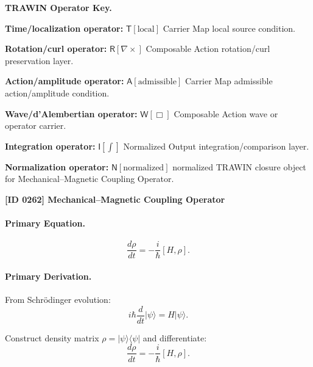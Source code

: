 \par\vspace{0.45\baselineskip}
\noindent\begin{minipage}[t]{\linewidth}
\begingroup
\small
\raggedright
\textbf{TRAWIN Operator Key.}\par
\noindent\textbf{Time/localization operator:} $\mathsf{T}\!\left[\mathrm{local}\right]$ Carrier Map local source condition.\par
\noindent\textbf{Rotation/curl operator:} $\mathsf{R}\!\left[\nabla\times\right]$ Composable Action rotation/curl preservation layer.\par
\noindent\textbf{Action/amplitude operator:} $\mathsf{A}\!\left[\mathrm{admissible}\right]$ Carrier Map admissible action/amplitude condition.\par
\noindent\textbf{Wave/d'Alembertian operator:} $\mathsf{W}\!\left[\Box\right]$ Composable Action wave or operator carrier.\par
\noindent\textbf{Integration operator:} $\mathsf{I}\!\left[\int\right]$ Normalized Output integration/comparison layer.\par
\noindent\textbf{Normalization operator:} $\mathsf{N}\!\left[\mathrm{normalized}\right]$ normalized TRAWIN closure object for Mechanical--Magnetic Coupling Operator.\par
\endgroup
\end{minipage}

\clearpage
\noindent\textbf{[ID 0262] Mechanical--Magnetic Coupling Operator}\par
\vspace{0.35em}
\paragraph{Primary Equation.}
\begin{equation}
\frac{d\rho}{dt} = -\frac{i}{\hbar}[H,\rho].
\end{equation}

\paragraph{Primary Derivation.}
From Schrödinger evolution:
\begin{equation}
i\hbar \frac{d}{dt}|\psi\rangle = H|\psi\rangle.
\end{equation}

Construct density matrix $\rho = |\psi\rangle\langle \psi|$ and differentiate:
\begin{equation}
\frac{d\rho}{dt} = -\frac{i}{\hbar}[H,\rho].
\end{equation}

